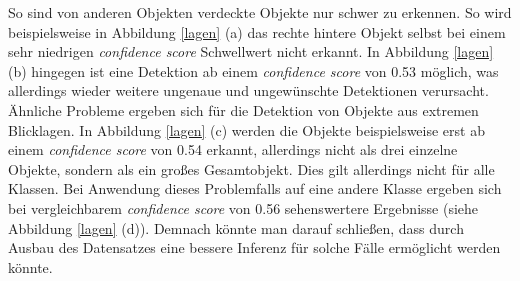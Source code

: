So sind von anderen Objekten verdeckte Objekte nur schwer zu erkennen. So wird beispielsweise in Abbildung \ref{lagen} (a) das rechte hintere Objekt selbst bei einem sehr niedrigen \textit{confidence score} Schwellwert nicht erkannt. In Abbildung \ref{lagen} (b) hingegen ist eine Detektion ab einem \textit{confidence score} von 0.53 möglich, was allerdings wieder weitere ungenaue und ungewünschte Detektionen verursacht. Ähnliche Probleme ergeben sich für die Detektion von Objekte aus extremen Blicklagen. In Abbildung \ref{lagen} (c) werden die Objekte beispielsweise erst ab einem \textit{confidence score} von 0.54 erkannt, allerdings nicht als drei einzelne Objekte, sondern als ein großes Gesamtobjekt. Dies gilt allerdings nicht für alle Klassen. Bei Anwendung dieses Problemfalls auf eine andere Klasse ergeben sich bei vergleichbarem \textit{confidence score} von 0.56 sehenswertere Ergebnisse (siehe Abbildung \ref{lagen} (d)). Demnach könnte man darauf schließen, dass durch Ausbau des Datensatzes eine bessere Inferenz für solche Fälle ermöglicht werden könnte.

